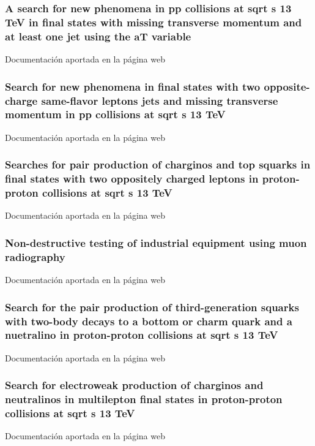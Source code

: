 \documentclass[a4paper, 11pt, twoside, openright]{report}
\begin{document}
\subsubsection{A search for new phenomena in pp collisions at sqrt s 13 TeV in final states with missing transverse momentum and at least one jet using the aT variable}
Documentación aportada en la página web
%
\subsubsection{Search for new phenomena in final states with two opposite-charge same-flavor leptons jets and missing transverse momentum in pp collisions at sqrt s 13 TeV}
Documentación aportada en la página web
%
\subsubsection{Searches for pair production of charginos and top squarks in final states with two oppositely charged leptons in proton-proton collisions at sqrt s 13 TeV}
Documentación aportada en la página web
%
\subsubsection{Non-destructive testing of industrial equipment using muon radiography}
Documentación aportada en la página web
%
\subsubsection{Search for the pair production of third-generation squarks with two-body decays to a bottom or charm quark and a nuetralino in proton-proton collisions at sqrt s 13 TeV}
Documentación aportada en la página web
%
\subsubsection{Search for electroweak production of charginos and neutralinos in multilepton final states in proton-proton collisions at sqrt s 13 TeV}
Documentación aportada en la página web
%
\end{document}

